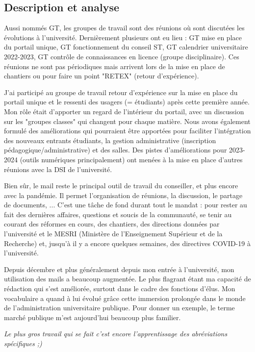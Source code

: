 \documentclass{article}
\begin{document}
\subsection{Description et analyse}
Aussi nommés GT, les groupes de travail sont des réunions où sont discutées les évolutions à l'université. Dernièrement plusieurs ont eu lieu : GT mise en place du portail unique, GT fonctionnement du conseil ST, GT calendrier  universitaire 2022-2023, GT contrôle de connaissances en licence (groupe disciplinaire). Ces réunions ne sont pas périodiques mais arrivent lors de la mise en place de chantiers ou pour faire un point "RETEX" (retour d'expérience).

J'ai participé au groupe de travail retour d'expérience sur la mise en place du portail unique et le ressenti des usagers (= étudiants) après cette première année. Mon rôle était d'apporter un regard de l'intérieur du portail, avec un discussion sur les "groupes classes" qui changent pour chaque matière. Nous avons également formulé des améliorations qui pourraient être apportées pour faciliter l'intégration des nouveaux entrants étudiants, la gestion administrative (inscription pédagogique/administrative) et des salles. Des pistes d'améliorations pour 2023-2024 (outils numériques principalement) ont menées à la mise en place d'autres réunions avec la DSI de l'université.

Bien sûr, le mail reste le principal outil de travail du conseiller, et plus encore avec la pandémie. Il permet l'organisation de réunions, la discussion, le partage de documents, ... C'est une tâche de fond durant tout le mandat : pour rester au fait des dernières affaires, questions et soucis de la communauté, se tenir au courant des réformes en cours, des chantiers, des directions données par l'université et le MESRI (Ministère de l'Enseignement Supérieur et de la Recherche) et, jusqu'à il y a encore quelques semaines, des directives COVID-19 à l'université.

Depuis décembre et plus généralement depuis mon entrée à l'université, mon utilisation des mails a beaucoup augmentée. Le plus flagrant étant ma capacité de rédaction qui s'est améliorée, surtout dans le cadre des fonctions d'élus. Mon vocabulaire a quand à lui évolué grâce cette immersion prolongée dans le monde de l'administration universitaire publique. Pour donner un exemple, le terme marché publique m'est aujourd'hui beaucoup plus familier. 

\textit{Le plus gros travail qui se fait c'est encore l'apprentissage des abréviations spécifiques ;)}
\end{document}
